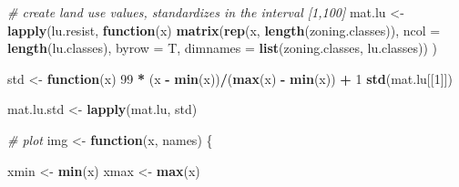 \documentclass[]{article}
\newenvironment{Shaded}{\begin{snugshade}}{\end{snugshade}}
\newcommand{\CommentTok}[1]{\textcolor[rgb]{0.56,0.35,0.01}{\textit{#1}}}
\newcommand{\ControlFlowTok}[1]{\textcolor[rgb]{0.13,0.29,0.53}{\textbf{#1}}}
\newcommand{\DataTypeTok}[1]{\textcolor[rgb]{0.13,0.29,0.53}{#1}}
\newcommand{\DecValTok}[1]{\textcolor[rgb]{0.00,0.00,0.81}{#1}}
\newcommand{\KeywordTok}[1]{\textcolor[rgb]{0.13,0.29,0.53}{\textbf{#1}}}
\newcommand{\NormalTok}[1]{#1}
\newcommand{\OperatorTok}[1]{\textcolor[rgb]{0.81,0.36,0.00}{\textbf{#1}}}
\newcommand{\StringTok}[1]{\textcolor[rgb]{0.31,0.60,0.02}{#1}}
\begin{document}
\begin{Shaded}
\begin{Highlighting}[]
\CommentTok{# create land use values, standardizes in the interval [1,100]}
\NormalTok{mat.lu <-}\StringTok{ }\KeywordTok{lapply}\NormalTok{(lu.resist, }\ControlFlowTok{function}\NormalTok{(x)}
  \KeywordTok{matrix}\NormalTok{(}\KeywordTok{rep}\NormalTok{(x, }\KeywordTok{length}\NormalTok{(zoning.classes)), }\DataTypeTok{ncol =} \KeywordTok{length}\NormalTok{(lu.classes), }\DataTypeTok{byrow =}\NormalTok{ T,}
              \DataTypeTok{dimnames =} \KeywordTok{list}\NormalTok{(zoning.classes, lu.classes))}
\NormalTok{)}

\NormalTok{std <-}\StringTok{ }\ControlFlowTok{function}\NormalTok{(x) }\DecValTok{99} \OperatorTok{*}\StringTok{ }\NormalTok{(x }\OperatorTok{-}\StringTok{ }\KeywordTok{min}\NormalTok{(x))}\OperatorTok{/}\NormalTok{(}\KeywordTok{max}\NormalTok{(x) }\OperatorTok{-}\StringTok{ }\KeywordTok{min}\NormalTok{(x)) }\OperatorTok{+}\StringTok{ }\DecValTok{1}
\KeywordTok{std}\NormalTok{(mat.lu[[}\DecValTok{1}\NormalTok{]])}

\NormalTok{mat.lu.std <-}\StringTok{ }\KeywordTok{lapply}\NormalTok{(mat.lu, std)}

\CommentTok{# plot}
\NormalTok{img <-}\StringTok{ }\ControlFlowTok{function}\NormalTok{(x, names) \{}

\NormalTok{  xmin <-}\StringTok{ }\KeywordTok{min}\NormalTok{(x)}
\NormalTok{  xmax <-}\StringTok{ }\KeywordTok{max}\NormalTok{(x)}
  

\end{Highlighting}
\end{Shaded}
\end{document}
